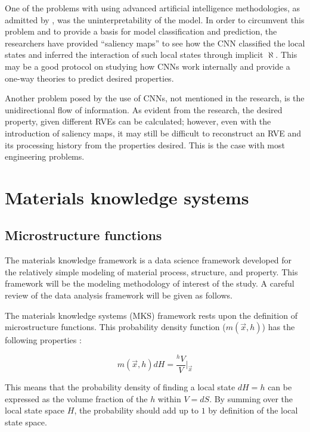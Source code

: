 One of the problems with using advanced artificial intelligence methodologies, as admitted by , was the uninterpretability of the model.
In order to circumvent this problem and to provide a basis for model classification and prediction, the researchers have provided ``saliency maps'' to see how the CNN classified the local states and inferred the interaction of such local states through implicit $\aleph$.
This may be a good protocol on studying how CNNs work internally and provide a one-way theories to predict desired properties.

Another problem posed by the use of CNNs, not mentioned in the research, is the unidirectional flow of information.
As evident from the research, the desired property, given different RVEs can be calculated; however, even with the introduction of saliency maps, it may still be difficult to reconstruct an RVE and its processing history from the properties desired.
This is the case with most engineering problems.


\section{Materials knowledge systems}

\subsection{Microstructure functions}

The materials knowledge framework is a data science framework developed for the relatively simple modeling of material process, structure, and property.
This framework will be the modeling methodology of interest of the study.
A careful review of the data analysis framework will be given as follows.

The materials knowledge systems (MKS) framework rests upon the definition of microstructure functions.
This probability density function ($m(\vec{x}, h)$) has the following properties \cite{delin}:

\[
  m(\vec{x}, h)dH = \dfrac{^{h}V}{V}\biggr\rvert_{\vec{x}}
\]

This means that the probability density of finding a local state $dH = h$ can be expressed as the volume fraction of the $h$ within $V = dS$.
By summing over the local state space $H$, the probability should add up to $1$ by definition of the local state space.

